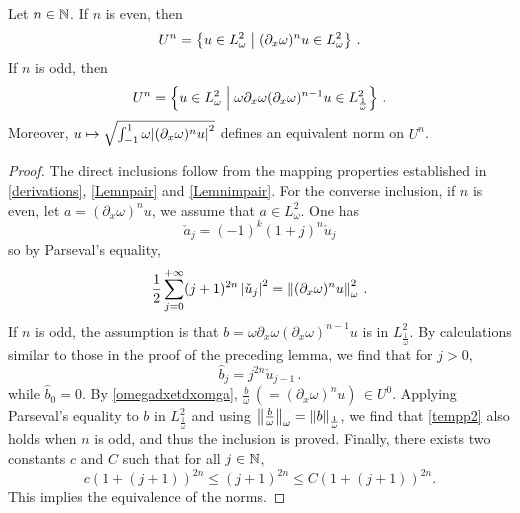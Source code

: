 \documentclass[a4paper]{article}
\begin{document}
\begin{Lem} 
	\label{LemEquivalentNormsUn}
	Let $n \in \mathbb{N}$. If $n$ is even, then
	\[U^n = \left\{u \in L^2_\omega\mathrel{}\middle|\mathrel{}(\partial_x \omega)^n u \in L^2_\omega\right\}\,.\]
	If $n$ is odd, then
	\[U^n = \left\{u \in L^2_\omega\mathrel{}\middle|\mathrel{}\omega \partial_x\omega (\partial_x \omega)^{n-1} u \in L^2_\frac{1}{\omega}\right\}\,.\]	
	Moreover, $u \mapsto \sqrt{\int_{-1}^{1} \omega {\left\lvert ( \partial_x \omega )^nu \right\rvert^2}}$ defines an equivalent norm on $U^n$. 
\end{Lem}
\begin{proof}
	The direct inclusions follow from the mapping properties established in \autoref{derivations}, \autoref{Lemnpair} and \autoref{Lemnimpair}. For the converse inclusion, if $n$ is even, let $a = (\partial_x \omega)^n u$, we assume that $a \in L^2_\omega$. One has 
	\[\check{a}_j = (-1)^k \left(1+j\right)^{n}\check{u}_j\] 
	so by Parseval's equality, 
	\begin{equation}
	\label{tempp2}
	\frac{1}{2}\sum_{j = 0 }^{+ \infty} (j+1)^{2n} \left\lvert \check{u}_j \right\rvert^2 = \left\|(\partial_x \omega)^nu\right\|^2_\omega\,.
	\end{equation}
	If $n$ is odd, the assumption is that $b = \omega \partial_x \omega(\partial_x \omega)^{n-1}u$ is in $L^2_\frac{1}{\omega}$. By calculations similar to those in the proof of the preceding lemma, we find that for $j > 0$,
	\[\hat{b}_j = j^{2n} \check{u}_{j-1}\,.\]
	while $\hat{b}_0 = 0$. By \autoref{omegadxetdxomga}, $\frac{b}{\omega} \,(= (\partial_x \omega)^n u)\, \in U^0$. Applying Parseval's equality to $b$ in $L^2_\frac{1}{\omega}$ and using $\left\|\frac{b}{\omega}\right\|_\omega = \left\|b\right\|_\frac{1}{\omega}$, we find that \eqref{tempp2} also holds when $n$ is odd, and thus the inclusion is proved. Finally, there exists two constants $c$ and $C$ such that for all $j \in \mathbb{N}$, 
	\[c(1 + (j + 1))^{2n} \leq (j + 1)^{2n}  \leq C(1 + (j+1))^{2n}.\]
	This implies the equivalence of the norms.
\end{proof}
\end{document}
